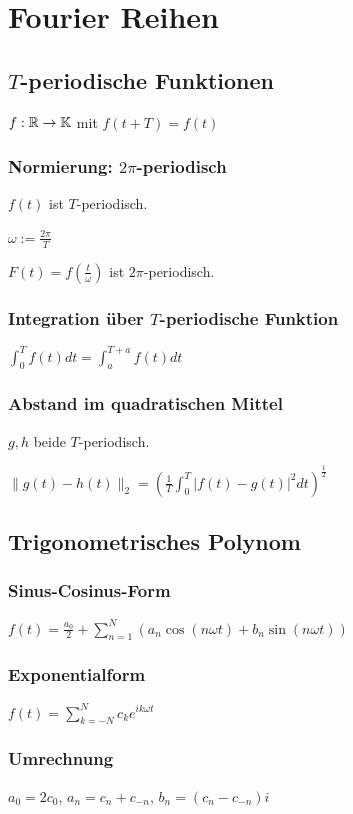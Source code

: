 \section*{Fourier Reihen}

\subsection*{$T$-periodische Funktionen}
$f: \mathbb{R} \to \mathbb{K}$ mit $f(t + T) = f(t)$

\subsubsection*{Normierung: $2\pi$-periodisch}
$f(t)$ ist $T$-periodisch.

$\omega := \frac{2\pi}{T}$

$F(t) = f(\frac{t}{\omega})$ ist $2\pi$-periodisch.

\subsubsection*{Integration über $T$-periodische Funktion}
$\int_0^T f(t)dt = \int_a^{T+a}f(t)dt$

\subsubsection*{Abstand im quadratischen Mittel}
$g,h$ beide $T$-periodisch.

$\|g(t)-h(t)\|_2 = \left(\frac{1}{T} \int_0^T |f(t)-g(t)|^2 dt\right)^{\frac{1}{2}}$

\subsection*{Trigonometrisches Polynom}

\subsubsection*{Sinus-Cosinus-Form}
$f(t) = \frac{a_0}{2} + \sum_{n=1}^N (a_n \cos(n\omega t) + b_n\sin(n\omega t))$

\subsubsection*{Exponentialform}
$f(t) = \sum_{k=-N}^{N} c_k e^{ik\omega t}$

\subsubsection*{Umrechnung}
$a_0=2c_0$, $a_n = c_n + c_{-n}$, $b_n=(c_n - c_{-n})i$

